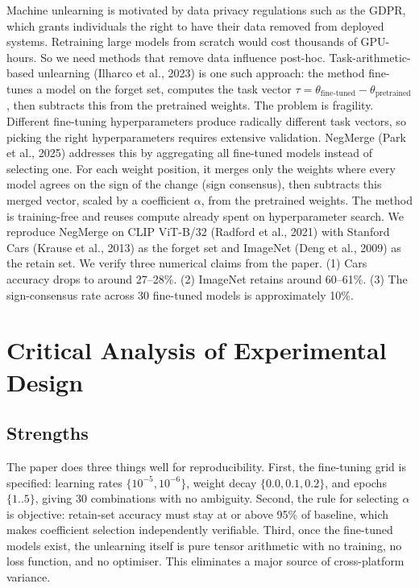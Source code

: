 \documentclass{article}
\begin{document}
Machine unlearning is motivated by data privacy regulations such as the GDPR, which grants individuals the right to have their data removed from deployed systems. Retraining large models from scratch would cost thousands of GPU-hours. So we need methods that remove data influence post-hoc. Task-arithmetic-based unlearning (Ilharco et al., 2023) is one such approach: the method fine-tunes a model on the forget set, computes the task vector $\tau = \theta_{\text{fine-tuned}} - \theta_{\text{pretrained}}$, then subtracts this from the pretrained weights. The problem is fragility. Different fine-tuning hyperparameters produce radically different task vectors, so picking the right hyperparameters requires extensive validation. NegMerge (Park et al., 2025) addresses this by aggregating all fine-tuned models instead of selecting one. For each weight position, it merges only the weights where every model agrees on the sign of the change (sign consensus), then subtracts this merged vector, scaled by a coefficient $\alpha$, from the pretrained weights. The method is training-free and reuses compute already spent on hyperparameter search. We reproduce NegMerge on CLIP ViT-B/32 (Radford et al., 2021) with Stanford Cars (Krause et al., 2013) as the forget set and ImageNet (Deng et al., 2009) as the retain set. We verify three numerical claims from the paper. (1) Cars accuracy drops to around 27--28\%. (2) ImageNet retains around 60--61\%. (3) The sign-consensus rate across 30 fine-tuned models is approximately 10\%.

\section{Critical Analysis of Experimental Design}

\subsection{Strengths}

The paper does three things well for reproducibility. First, the fine-tuning grid is specified: learning rates $\{10^{-5}, 10^{-6}\}$, weight decay $\{0.0, 0.1, 0.2\}$, and epochs $\{1..5\}$, giving 30 combinations with no ambiguity. Second, the rule for selecting $\alpha$ is objective: retain-set accuracy must stay at or above 95\% of baseline, which makes coefficient selection independently verifiable. Third, once the fine-tuned models exist, the unlearning itself is pure tensor arithmetic with no training, no loss function, and no optimiser. This eliminates a major source of cross-platform variance.
\end{document}
